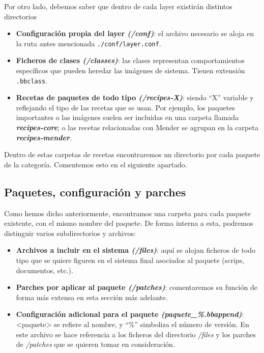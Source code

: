 Por otro lado, debemos saber que dentro de cada layer existirán distintos directorios 

\begin{itemize}
	\item \textbf{Configuración propia del layer \textit{(/conf)}}: el archivo necesario se aloja en la ruta antes mencionada \texttt{./conf/layer.conf}.
	\item \textbf{Ficheros de clases \textit{(/classes)}}: las clases representan comportamientos específicos que pueden heredar las imágenes de sistema. Tienen extensión \texttt{.bbclass}.
	\item \textbf{Recetas de paquetes de todo tipo \textit{(/recipes-X)}}: siendo ``X'' variable y reflejando el tipo de las recetas que se usan. Por ejemplo, los paquetes importantes o las imágenes suelen ser incluidas en una carpeta llamada \textbf{\textit{recipes-core}}; o las recetas relacionadas con Mender se agrupan en la carpeta \textbf{\textit{recipes-mender}}.
\end{itemize}

Dentro de estas carpetas de recetas encontraremos un directorio por cada paquete de la categoría. Comentemos esto en el siguiente apartado.\\

\subsection{Paquetes, configuración y parches}

Como hemos dicho anteriormente, encontramos una carpeta para cada paquete existente, con el mismo nombre del paquete. De forma interna a esta, podremos distinguir varios subdirectorios y archivos:

\begin{itemize}
	\item \textbf{Archivos a incluir en el sistema \textit{(/files)}}: aquí se alojan ficheros de todo tipo que se quiere figuren en el sistema final asociados al paquete (scrips, documentos, etc.).
	\item \textbf{Parches por aplicar al paquete \textit{(/patches)}}: comentaremos su función de forma más extensa en esta sección más adelante.
	\item \textbf{Configuración adicional para el paquete \textit{(paquete\_\%.bbappend)}}: <paquete> se refiere al nombre, y ``\%'' simboliza el número de versión. En este archivo se hace referencia a los ficheros del directorio \textit{/files} y los parches de \textit{/patches} que se quieren tomar en consideración.
\end{itemize}

